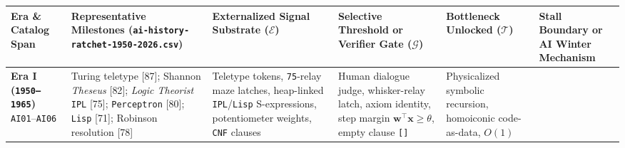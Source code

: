 \documentclass[10pt,letterpaper]{article}
\begin{document}
{\scriptsize\setlength{\tabcolsep}{3.0pt}\renewcommand{\arraystretch}{1.14}
\begin{longtable}[]{@{}
  >{\raggedright\arraybackslash}p{}
  >{\raggedright\arraybackslash}p{}
  >{\raggedright\arraybackslash}p{}
  >{\raggedright\arraybackslash}p{}
  >{\raggedright\arraybackslash}p{}
  >{\raggedright\arraybackslash}p{}@{}}
\toprule\noalign{}
\begin{minipage}[b]{\linewidth}\raggedright
\textbf{Era \& Catalog Span}
\end{minipage} & \begin{minipage}[b]{\linewidth}\raggedright
\textbf{Representative Milestones
(\texttt{ai-\allowbreak{}history-\allowbreak{}ratchet-\allowbreak{}1950-\allowbreak{}2026.\allowbreak{}csv})}
\end{minipage} & \begin{minipage}[b]{\linewidth}\raggedright
\textbf{Externalized Signal Substrate (\(\mathcal{E}\))}
\end{minipage} & \begin{minipage}[b]{\linewidth}\raggedright
\textbf{Selective Threshold or Verifier Gate (\(\mathcal{G}\))}
\end{minipage} & \begin{minipage}[b]{\linewidth}\raggedright
\textbf{Bottleneck Unlocked (\(\mathcal{T}\))}
\end{minipage} & \begin{minipage}[b]{\linewidth}\raggedright
\textbf{Stall Boundary or AI Winter Mechanism}
\end{minipage} \\
\midrule\noalign{}
\endhead
\bottomrule\noalign{}
\endlastfoot
\textbf{Era I (\texttt{1950–1965})} \texttt{AI01}--\texttt{AI06} &
Turing teletype {[}87{]}; Shannon \emph{Theseus} {[}82{]}; \emph{Logic
Theorist} \texttt{IPL} {[}75{]}; \texttt{Perceptron} {[}80{]};
\texttt{Lisp} {[}71{]}; Robinson resolution {[}78{]} & Teletype tokens,
\texttt{75}-relay maze latches, heap-linked \texttt{IPL}/\allowbreak{}\texttt{Lisp}
S-expressions, potentiometer weights, \texttt{CNF} clauses & Human
dialogue judge, whisker-relay latch, axiom identity, step margin
\(\mathbf{w}^\top \mathbf{x} \ge \theta\), empty clause \texttt{{[}{]}}
& Physicalized symbolic recursion, homoiconic code-as-data, \(O(1)\)

\end{longtable}}
\end{document}
